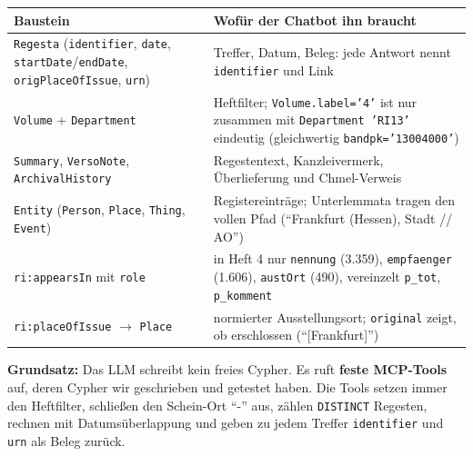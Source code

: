 \documentclass[10pt,a4paper]{article}
\newcommand{\code}[1]{\texttt{\small #1}}
\begin{document}
\begin{small}
\begin{tabularx}{\textwidth}{@{}p{5.6cm}L@{}}
\toprule
\textbf{Baustein} & \textbf{Wofür der Chatbot ihn braucht}\\\midrule
\code{Regesta} (\code{identifier}, \code{date}, \code{startDate}/\code{endDate}, \code{origPlaceOfIssue}, \code{urn}) & Treffer, Datum, Beleg: jede Antwort nennt \code{identifier} und Link\\
\code{Volume} + \code{Department} & Heftfilter; \code{Volume.label='4'} ist nur zusammen mit \code{Department 'RI13'} eindeutig (gleichwertig \code{bandpk='13004000'})\\
\code{Summary}, \code{VersoNote}, \code{ArchivalHistory} & Regestentext, Kanzleivermerk, Überlieferung und Chmel-Verweis\\
\code{Entity} (\code{Person}, \code{Place}, \code{Thing}, \code{Event}) & Registereinträge; Unterlemmata tragen den vollen Pfad (\enquote{Frankfurt (Hessen), Stadt // AO})\\
\code{ri:appearsIn} mit \code{role} & in Heft 4 nur \code{nennung} (3.359), \code{empfaenger} (1.606), \code{austOrt} (490), vereinzelt \code{p\_tot}, \code{p\_komment}\\
\code{ri:placeOfIssue} $\to$ \code{Place} & normierter Ausstellungsort; \code{original} zeigt, ob erschlossen (\enquote{[Frankfurt]})\\
\bottomrule
\end{tabularx}
\end{small}

\medskip
\noindent\textbf{Grundsatz:} Das LLM schreibt kein freies Cypher. Es ruft \textbf{feste MCP-Tools} auf, deren Cypher wir geschrieben und getestet haben. Die Tools setzen immer den Heftfilter, schließen den Schein-Ort \enquote{-} aus, zählen \code{DISTINCT} Regesten, rechnen mit Datumsüberlappung und geben zu jedem Treffer \code{identifier} und \code{urn} als Beleg zurück.
\end{document}

